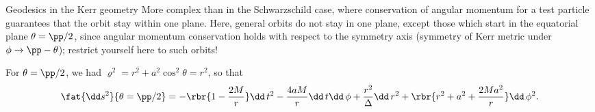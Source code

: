 \begin{nameddef}{Geodesics in the Kerr geometry}
More complex than in the Schwarzschild case, where conservation of angular
momentum for a test particle guarantees that the orbit stay within one plane.
Here, general orbits do not stay in one plane, except those which start in the
equatorial plane $\theta = \pp/2$, since angular momentum conservation holds
with respect to the symmetry axis (symmetry of Kerr metric under $\phi \to
\pp - \theta$); restrict yourself here to such orbits!

For $\theta = \pp/2$, we had $\varrho^2 = r^2 + a^2\cos^2\theta = r^2$, so
that
\begin{equation}
\fat{\dd s^2}{\theta = \pp/2} = -\rbr{1-\frac{2M}{r}}\dd\, t^2
- \frac{4aM}{r}\dd\, t\dd\,\phi + \frac{r^2}{\Delta}\dd\, r^2
+ \rbr{r^2 + a^2 + \frac{2Ma^2}{r}}\dd\,\phi^2.
\end{equation}
\end{nameddef} %

